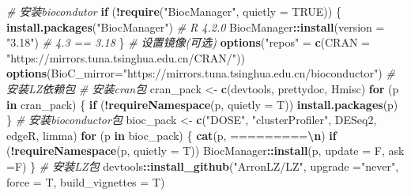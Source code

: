 \documentclass[
]{book}
\newenvironment{Shaded}{\begin{snugshade}}{\end{snugshade}}
\newcommand{\AttributeTok}[1]{\textcolor[rgb]{0.13,0.29,0.53}{#1}}
\newcommand{\CommentTok}[1]{\textcolor[rgb]{0.56,0.35,0.01}{\textit{#1}}}
\newcommand{\ConstantTok}[1]{\textcolor[rgb]{0.56,0.35,0.01}{#1}}
\newcommand{\ControlFlowTok}[1]{\textcolor[rgb]{0.13,0.29,0.53}{\textbf{#1}}}
\newcommand{\FunctionTok}[1]{\textcolor[rgb]{0.13,0.29,0.53}{\textbf{#1}}}
\newcommand{\NormalTok}[1]{#1}
\newcommand{\OtherTok}[1]{\textcolor[rgb]{0.56,0.35,0.01}{#1}}
\newcommand{\SpecialCharTok}[1]{\textcolor[rgb]{0.81,0.36,0.00}{\textbf{#1}}}
\newcommand{\StringTok}[1]{\textcolor[rgb]{0.31,0.60,0.02}{#1}}
\begin{document}
\begin{Shaded}
\begin{Highlighting}[]
\CommentTok{\# 安装biocondutor}
\ControlFlowTok{if}\NormalTok{ (}\SpecialCharTok{!}\FunctionTok{require}\NormalTok{(}\StringTok{"BiocManager"}\NormalTok{, }\AttributeTok{quietly =} \ConstantTok{TRUE}\NormalTok{)) \{}
  \FunctionTok{install.packages}\NormalTok{(}\StringTok{"BiocManager"}\NormalTok{)}
  \CommentTok{\# R 4.2.0}
\NormalTok{  BiocManager}\SpecialCharTok{::}\FunctionTok{install}\NormalTok{(}\AttributeTok{version =} \StringTok{"3.18"}\NormalTok{) }\CommentTok{\# 4.3 == 3.18}
\NormalTok{\}}
\CommentTok{\# 设置镜像(可选)}
\FunctionTok{options}\NormalTok{(}\StringTok{"repos"} \OtherTok{=} \FunctionTok{c}\NormalTok{(}\AttributeTok{CRAN =} \StringTok{"https://mirrors.tuna.tsinghua.edu.cn/CRAN/"}\NormalTok{)) }
\FunctionTok{options}\NormalTok{(}\AttributeTok{BioC\_mirror=}\StringTok{"https://mirrors.tuna.tsinghua.edu.cn/bioconductor"}\NormalTok{)}
\CommentTok{\# 安装LZ依赖包}
\CommentTok{\# 安装cran包}
\NormalTok{cran\_pack }\OtherTok{\textless{}{-}} \FunctionTok{c}\NormalTok{(}\StringTok{\textquotesingle{}devtools\textquotesingle{}}\NormalTok{, }\StringTok{\textquotesingle{}prettydoc\textquotesingle{}}\NormalTok{, }\StringTok{\textquotesingle{}Hmisc\textquotesingle{}}\NormalTok{)}
\ControlFlowTok{for}\NormalTok{ (p }\ControlFlowTok{in}\NormalTok{ cran\_pack) \{ }\ControlFlowTok{if}\NormalTok{ (}\SpecialCharTok{!}\FunctionTok{requireNamespace}\NormalTok{(p, }\AttributeTok{quietly =}\NormalTok{ T)) }\FunctionTok{install.packages}\NormalTok{(p) \}}
\CommentTok{\# 安装bioconductor包}
\NormalTok{bioc\_pack }\OtherTok{\textless{}{-}} \FunctionTok{c}\NormalTok{(}\StringTok{"DOSE"}\NormalTok{, }\StringTok{"clusterProfiler"}\NormalTok{, }\StringTok{\textquotesingle{}DESeq2\textquotesingle{}}\NormalTok{, }\StringTok{\textquotesingle{}edgeR\textquotesingle{}}\NormalTok{, }\StringTok{\textquotesingle{}limma\textquotesingle{}}\NormalTok{)}
\ControlFlowTok{for}\NormalTok{ (p }\ControlFlowTok{in}\NormalTok{ bioc\_pack) \{ }
  \FunctionTok{cat}\NormalTok{(p, }\StringTok{\textquotesingle{}=========}\SpecialCharTok{\textbackslash{}n}\StringTok{\textquotesingle{}}\NormalTok{) }
  \ControlFlowTok{if}\NormalTok{ (}\SpecialCharTok{!}\FunctionTok{requireNamespace}\NormalTok{(p, }\AttributeTok{quietly =}\NormalTok{ T)) BiocManager}\SpecialCharTok{::}\FunctionTok{install}\NormalTok{(p, }\AttributeTok{update =}\NormalTok{ F, }\AttributeTok{ask =}\NormalTok{F) }
\NormalTok{  \}}
\CommentTok{\# 安装LZ包}
\NormalTok{devtools}\SpecialCharTok{::}\FunctionTok{install\_github}\NormalTok{(}\StringTok{"ArronLZ/LZ"}\NormalTok{, }\AttributeTok{upgrade =}\StringTok{"never"}\NormalTok{, }\AttributeTok{force =}\NormalTok{ T, }
                         \AttributeTok{build\_vignettes =}\NormalTok{ T)}
\end{Highlighting}
\end{Shaded}
\end{document}
